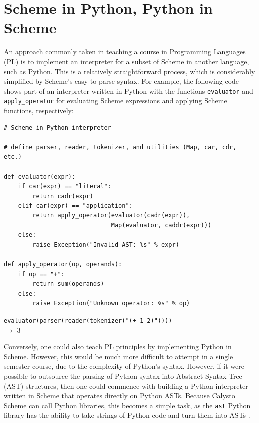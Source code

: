 \documentclass[acmsmall,screen,authorversion]{acmart}
\begin{document}
\section{Scheme in Python, Python in Scheme}

An approach commonly taken in teaching a course in Programming Languages (PL)
is to implement an interpreter for a subset of Scheme in another language, such
as Python. This is a relatively straightforward process, which is considerably
simplified by Scheme's easy-to-parse syntax.  For example, the following code
shows part of an interpreter written in Python with the functions
\texttt{evaluator} and \texttt{apply\_operator} for evaluating Scheme
expressions and applying Scheme functions, respectively:\\

\begin{minipage}{\textwidth}
{\small
\begin{verbatim}
# Scheme-in-Python interpreter

# define parser, reader, tokenizer, and utilities (Map, car, cdr, etc.)

def evaluator(expr):
    if car(expr) == "literal":
        return cadr(expr)
    elif car(expr) == "application":
        return apply_operator(evaluator(cadr(expr)),
                              Map(evaluator, caddr(expr)))
    else:
        raise Exception("Invalid AST: %s" % expr)

def apply_operator(op, operands):
    if op == "+":
        return sum(operands)
    else:
        raise Exception("Unknown operator: %s" % op)

\end{verbatim}
\texttt{evaluator(parser(reader(tokenizer("(+ 1 2)"))))}\\
$\rightarrow$ 3\\
}
\end{minipage}

\noindent
Conversely, one could also teach PL principles by implementing Python in
Scheme. However, this would be much more difficult to attempt in a single
semester course, due to the complexity of Python's syntax. However, if it were
possible to outsource the parsing of Python syntax into Abstract Syntax Tree
(AST) structures, then one could commence with building a Python interpreter
written in Scheme that operates directly on Python ASTs. Because Calysto Scheme
can call Python libraries, this becomes a simple task, as the \texttt{ast}
Python library has the ability to take strings of Python code and turn them
into ASTs \cite{PythonInScheme}.
\end{document}

